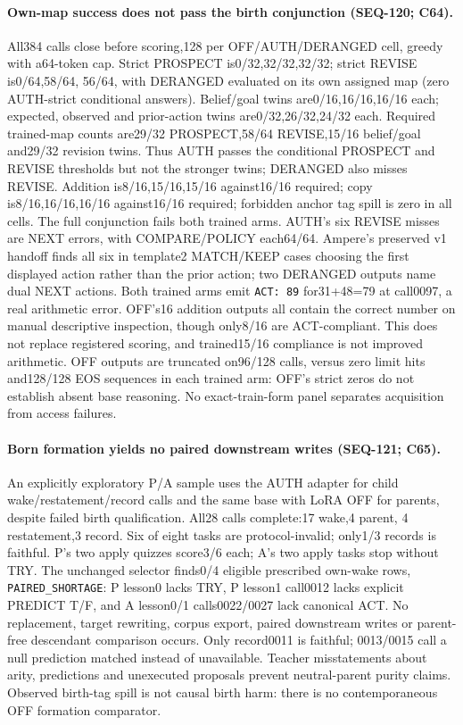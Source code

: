 \documentclass{article}
\begin{document}
\paragraph{Own-map success does not pass the birth conjunction (SEQ-120; C64).}
All384 calls close before scoring,128 per OFF/AUTH/DERANGED cell, greedy with
a64-token cap. Strict PROSPECT is0/32,32/32,32/32; strict REVISE is0/64,58/64,
56/64, with DERANGED evaluated on its own assigned map (zero AUTH-strict
conditional answers). Belief/goal twins are0/16,16/16,16/16 each; expected,
observed and prior-action twins are0/32,26/32,24/32 each. Required trained-map
counts are29/32 PROSPECT,58/64 REVISE,15/16 belief/goal and29/32 revision twins.
Thus AUTH passes the conditional PROSPECT and REVISE thresholds but not the stronger twins;
DERANGED also misses REVISE. Addition is8/16,15/16,15/16 against16/16 required;
copy is8/16,16/16,16/16 against16/16 required; forbidden anchor tag spill is
zero in all cells. The full conjunction fails both trained arms. AUTH's six
REVISE misses are NEXT errors, with COMPARE/POLICY each64/64. Ampere's preserved v1
handoff finds all six in template2 MATCH/KEEP cases choosing the first displayed
action rather than the prior action; two DERANGED outputs name dual NEXT actions.
Both trained arms emit \texttt{ACT: 89} for31+48=79 at call0097, a real arithmetic
error. OFF's16 addition outputs all contain the correct number on manual
descriptive inspection, though only8/16 are ACT-compliant. This does not replace
registered scoring, and trained15/16 compliance is not improved arithmetic.
OFF outputs are
truncated on96/128 calls, versus zero limit hits and128/128 EOS sequences in
each trained arm: OFF's strict zeros do not establish absent base reasoning.
No exact-train-form panel separates acquisition from access failures.

\paragraph{Born formation yields no paired downstream writes (SEQ-121; C65).}
An explicitly exploratory P/A sample uses the AUTH adapter for child
wake/restatement/record calls and the same base with LoRA OFF for parents,
despite failed birth qualification. All28 calls complete:17 wake,4 parent,
4 restatement,3 record. Six of eight tasks are protocol-invalid; only1/3 records
is faithful. P's two apply quizzes score3/6 each; A's two apply tasks stop
without TRY. The unchanged selector finds0/4 eligible prescribed own-wake
rows, \texttt{PAIRED\_SHORTAGE}: P lesson0 lacks TRY, P lesson1 call0012 lacks
explicit PREDICT T/F, and A lesson0/1 calls0022/0027 lack canonical ACT.
No replacement, target rewriting, corpus export, paired downstream writes or
parent-free descendant comparison occurs. Only record0011 is faithful;
0013/0015 call a null prediction matched instead of unavailable. Teacher
misstatements about arity, predictions and unexecuted proposals prevent
neutral-parent purity claims. Observed birth-tag spill is not causal birth
harm: there is no contemporaneous OFF formation comparator.
\end{document}
